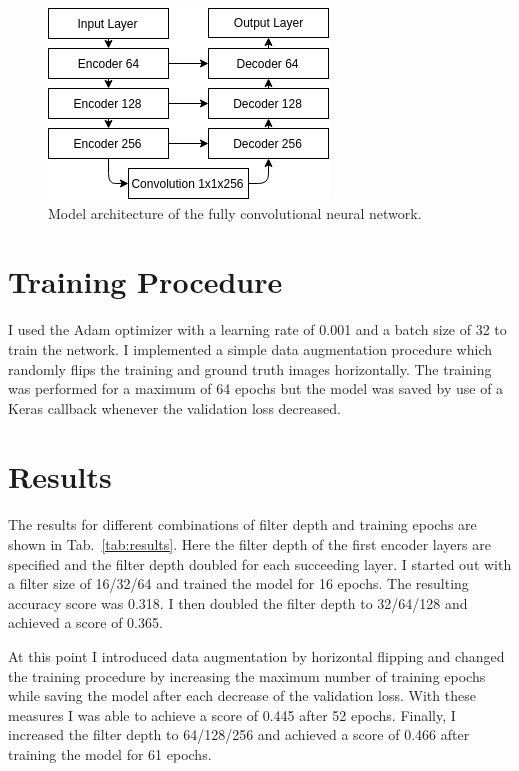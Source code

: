 \documentclass[twoside, twocolumn]{article}
\newcommand{\tabref}[1]{Tab.~\ref{tab:#1}}
\begin{document}
\begin{figure}[ht]
\centering
\includegraphics[width=0.75\columnwidth]{fig/model_alt.png}
\caption{\label{fig:model} Model architecture of the fully convolutional neural network.}
\end{figure}

\section{Training Procedure}
I used the Adam optimizer with a learning rate of 0.001 and a batch size of 32 to train the network.
I implemented a simple data augmentation procedure which randomly flips the training and
ground truth images horizontally. The training was performed for a maximum of 64 epochs
but the model was saved by use of a Keras callback whenever the validation loss decreased.


\section{Results}
The results for different combinations of filter depth and training epochs are
shown in \tabref{results}. Here the filter depth of the first encoder layers are
specified and the filter depth doubled for each succeeding layer. I started out
with a filter size of 16/32/64 and trained the model for 16 epochs. The resulting
accuracy score was 0.318. I then doubled the filter depth to 32/64/128 and achieved
a score of 0.365.

At this point I introduced data augmentation by horizontal flipping and changed
the training procedure by increasing the maximum number of training epochs while
saving the model after each decrease of the validation loss. With these measures
I was able to achieve a score of 0.445 after 52 epochs. Finally, I increased the filter depth
to 64/128/256 and achieved a score of 0.466 after training the model for 61 epochs.
\end{document}
